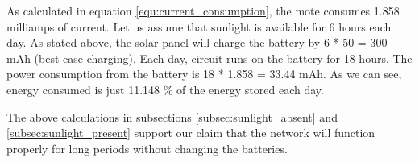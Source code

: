 As calculated in equation \ref{equ:current_consumption}, the mote consumes 1.858 milliamps of current. Let us assume that sunlight is available for 6 hours each day. As stated above, the solar panel will charge the battery by 6 * 50 = 300 mAh (best case charging). Each day, circuit runs on the battery for 18 hours. The power consumption from the battery is 18 * 1.858 = 33.44 mAh. As we can see, energy consumed is just 11.148 \% of the energy stored each day.

The above calculations in subsections \ref{subsec:sunlight_absent} and \ref{subsec:sunlight_present} support our claim that the network will function properly for long periods without changing the batteries.
\newpage











